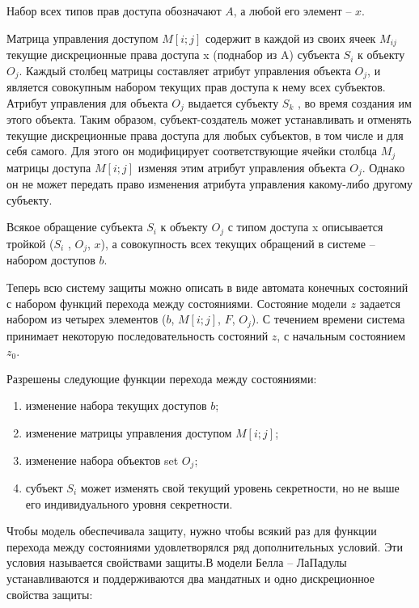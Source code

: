 Набор всех типов прав доступа обозначают $A$, а любой его элемент -- $x$. 

Матрица управления доступом $M[i;j]$ содержит в каждой из своих ячеек $M_{ij}$ текущие дискреционные права доступа x (поднабор из A) субъекта $S_i$ к объекту $O_j$. Каждый столбец матрицы составляет атрибут управления объекта $O_j$, и является совокупным набором текущих прав доступа к нему всех субъектов. Атрибут управления для объекта $O_j$ выдается субъекту $S_k$ , во время создания им этого объекта. Таким образом, субъект-создатель может устанавливать и отменять текущие дискреционные права доступа для любых субъектов, в том числе и для себя самого. Для этого он модифицирует соответствующие ячейки столбца $M_j$ матрицы доступа $M[i;j]$ изменяя этим атрибут управления объекта $O_j$. Однако он не может передать право изменения атрибута управления какому-либо другому субъекту. 

Всякое обращение субъекта $S_i$ к объекту $O_j$ с типом доступа x описывается тройкой ($S_i$ , $O_j$, $x$), а совокупность всех текущих обращений в системе -- набором доступов $b$. 

Теперь всю систему защиты можно описать в виде автомата конечных состояний с набором функций перехода между состояниями. Состояние модели $z$ задается набором из четырех элементов ($b$, $M[i;j]$, $F$,  $O_j$). С течением времени система принимает некоторую последовательность состояний $z$, с начальным состоянием $z_0$. 

Разрешены следующие функции перехода между состояниями: 

\begin{enumerate}
	\item изменение набора текущих доступов $b$; 
	\item изменение матрицы управления доступом $M[i;j]$; 
	\item изменение набора объектов set $O_j$;
	\item субъект $S_i$ может изменять свой текущий уровень секретности, но не выше его индивидуального уровня секретности. 
\end{enumerate}

Чтобы модель обеспечивала защиту, нужно чтобы всякий раз для функции перехода между состояниями удовлетворялся ряд дополнительных условий. Эти условия называется свойствами защиты.В модели Белла – ЛаПадулы устанавливаются и поддерживаются два мандатных и одно дискреционное свойства защиты\footnotemark:


